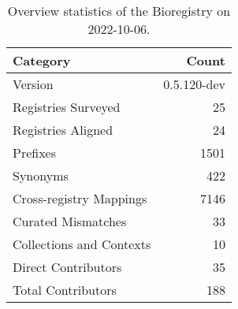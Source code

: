 \begin{table}
\centering
\caption{Overview statistics of the Bioregistry on 2022-10-06.}
\label{tab:bioregistry-summary}
\begin{tabular}{lr}
\toprule
                Category &       Count \\
\midrule
                 Version & 0.5.120-dev \\
     Registries Surveyed &          25 \\
      Registries Aligned &          24 \\
                Prefixes &        1501 \\
                Synonyms &         422 \\
 Cross-registry Mappings &        7146 \\
      Curated Mismatches &          33 \\
Collections and Contexts &          10 \\
     Direct Contributors &          35 \\
      Total Contributors &         188 \\
\bottomrule
\end{tabular}
\end{table}
